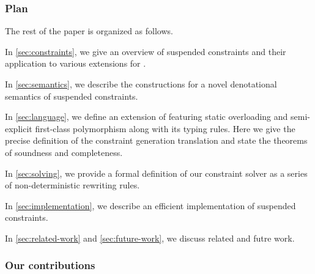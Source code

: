 \documentclass[acmsmall,screen,nonacm]{acmart}
\begin{document}
\subsubsection* {Plan}

The rest of the paper is organized as follows.
\begin{enumerate*}[label={}]
\item
  In \cref{sec:constraints}, we give an overview of suspended constraints
  and their application to various extensions for \ML.
\item
  In \cref{sec:semantics}, we describe the constructions for a
  novel denotational semantics of suspended constraints.
\item
  In \cref{sec:language}, we define an extension of \ML featuring static
  overloading and semi-explicit first-class polymorphism along with its
  typing rules.  Here we give the precise definition of the constraint
  generation translation and state the theorems of soundness and
  completeness.
\item
  In \cref{sec:solving}, we provide a formal definition of our constraint
  solver as a series of non-deterministic rewriting rules.
\item
  In \cref{sec:implementation}, we describe an efficient implementation of
  suspended constraints.
\item
  In \cref{sec:related-work} and \cref{sec:future-work}, we discuss related
  and futre work.
\end{enumerate*}


\subsubsection* {Our contributions}
\end{document}
